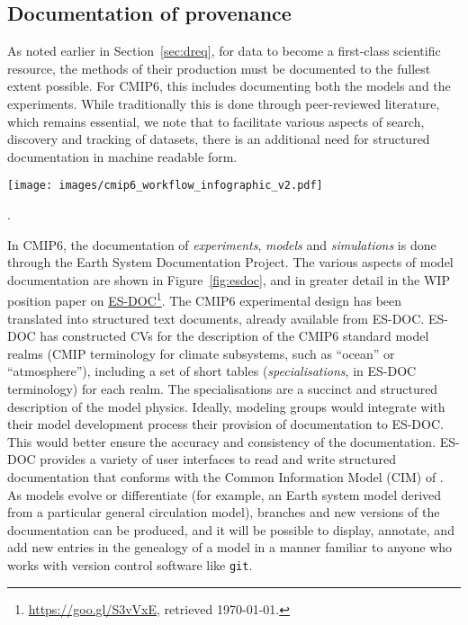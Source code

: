 \documentclass[gmd,manuscript]{copernicus}
\newcommand{\urlref}[2] {\href{#1}{#2}\footnote{\url{#1}, retrieved \today.}}
\begin{document}
\subsection{Documentation of provenance}
\label{sec:doc}

As noted earlier in Section~\ref{sec:dreq}, for data to become a
first-class scientific resource, the methods of their production must
be documented to the fullest extent possible. For CMIP6, this includes
documenting both the models and the experiments. While traditionally
this is done through peer-reviewed literature, which remains
essential, we note that to facilitate various aspects of search,
discovery and tracking of datasets, there is an additional need for
structured documentation in machine readable form.

\begin{figure*}
  \begin{center}
    \texttt{[image: images/cmip6\_workflow\_infographic\_v2.pdf]}
  \end{center}
  \caption{Elements of ES-DOC documentation. Rows indicate phases of
    the modeling process being documented, and box colors indicate the
    parties responsible for producing the documentation (see legend).
    Figure courtesy Guillaume Levavasseur, IPSL}.
  \label{fig:esdoc}
\end{figure*}

In CMIP6, the documentation of \emph{experiments}, \emph{models} and
\emph{simulations} is done through the Earth System Documentation
\citep[\urlref{https://goo.gl/WNwKD9}{ES-DOC},][]{ref:guilyardietal2013}
Project. The various aspects of model documentation are shown in
Figure~\ref{fig:esdoc}, and in greater detail in the WIP position
paper on \urlref{https://goo.gl/S3vVxE}{ES-DOC}. The CMIP6
experimental design has been translated into structured text
documents, already available from ES-DOC. ES-DOC has constructed CVs
for the description of the CMIP6 standard model realms
(CMIP terminology for climate subsystems, such as ``ocean'' or
``atmosphere''), including a set of short tables
(\emph{specialisations}, in ES-DOC terminology) for each realm.
The specialisations are a succinct and structured description of the
model physics. Ideally, modeling groups would integrate with their
model development process their provision of documentation to ES-DOC.
This would better ensure the accuracy and consistency of the
documentation. ES-DOC provides a variety of user interfaces to read
and write structured documentation that conforms with the Common
Information Model (CIM) of \cite{ref:lawrenceetal2012}. As models
evolve or differentiate (for example, an Earth system model derived
from a particular general circulation model), branches and new
versions of the documentation can be produced,
and it will be possible to display, annotate, and add new entries in
the genealogy of a model in a manner familiar to anyone who works with
version control software like \texttt{git}.
\end{document}
